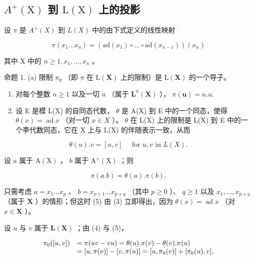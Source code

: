 \subsection{\texorpdfstring{\(A^{+}(\mathrm{X})\) 到 \(\mathrm{L}(\mathrm{X})\) 上的投影}{A+ (X) 到 L(X) 上的投影}}

设 \(\pi\) 是 \(A^{+}(X)\) 到 \(L(X)\) 中的由下式定义的线性映射

\[
\pi (x _ {1} \dots x _ {n}) = (\mathrm{ad} (x _ {1}) \circ \dots \circ \mathrm{ad} (x _ {n - 1})) (x _ {n})\tag{3}
\]

其中 X 中的 \(n \geqslant 1, x_1, \ldots, x_n\) 。

命题 1. (a) 限制 \(\pi_0\) （即 \(\pi\) 在 \(\mathrm{L}(\mathbf{X})\) 上的限制）是 \(\mathrm{L}(\mathbf{X})\) 的一个导子。

\begin{enumerate}
\def\labelenumi{(\alph{enumi})}
\setcounter{enumi}{1}
\item
  对每个整数 \(n \geqslant 1\) 以及一切 \(u\) （属于 \(\mathbf{L}^n(\mathbf{X})\) ）， \(\pi(\mathbf{u}) = n.u.\)
\item
  设 E 是模 L(X) 的自同态代数， \(\theta\) 是 A(X) 到 E 中的一个同态，使得 \(\theta(x) = \operatorname{ad} x\) （对一切 \(x \in X\) ）。 \(\theta\) 在 L(X) 上的限制是 L(X) 到 E 中的一个李代数同态，它在 X 上与 L(X) 的伴随表示一致，从而
\end{enumerate}

\[
\theta (u). v = [ u, v ] \quad \text { for   } u, v \text {   in   } L (X).\tag{4}
\]

设 \(a\) 属于 \(\mathrm{A}(\mathrm{X})\) ， \(b\) 属于 \(\mathrm{A}^{+}(\mathrm{X})\) ；则

\[
\pi (a. b) = \theta (a). \pi (b).\tag{5}
\]

只需考虑 \(a = x_{1} \ldots x_{p}\) 、 \(b = x_{p+1} \ldots x_{p+q}\) （其中 \(p \geqslant 0\) ）、 \(q \geqslant 1\) 以及 \(x_{1}, \ldots, x_{p+q}\) （属于 \(\mathbf{X}\) ）的情形；但这时 (5) 由 (3) 立即得出，因为 \(\theta(x) = \operatorname{ad} x\) （对 \(x \in \mathbf{X}\) ）。

设 \(u\) 与 \(v\) 属于 \(\mathbf{L}(\mathbf{X})\) ；由 (4) 与 (5)，

\[
\begin{array}{r l} \pi_ {0} ([ u, v ]) & = \pi (u v - v u) = \theta (u). \pi (v) - \theta (v). \pi (u) \\ & = [ u, \pi (v) ] - [ v, \pi (u) ] = [ u, \pi_ {0} (v) ] + [ \pi_ {0} (u), v ], \end{array}
\]

